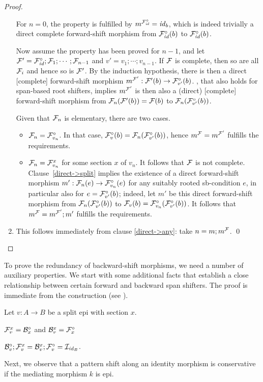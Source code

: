 \begin{proof}
\begin{enumerate}[topsep=\smallskipamount]
\smallskip For $n=0$, the property is fulfilled by $m^{\dF\id}=\id_b$, which is indeed trivially a direct complete forward-shift morphism from $\dF\id(b)$ to $\dF\id(b)$.

\smallskip Now assume the property has been proved for $n-1$, and let $\cF'=\dF\id;\cF_1;\cdots;\cF_{n-1}$ and $v'=v_1;\cdots;v_{n-1}$. If $\cF$ is complete, then so are all $\cF_i$ and hence so is $\cF'$. By the induction hypothesis, there is then a direct [complete] forward-shift morphism $m^{\cF'}:\cF'(b) \to \dF{v'}(b)$. , that also holds for span-based root shifters, implies $m^{\cF'}$ is then also a (direct) [complete] forward-shift morphism from $\cF_n(\cF'(b))=\cF(b)$ to $\cF_n(\dF{v'}(b))$.

\smallskip
Given that $\cF_n$ is elementary, there are two cases.
\begin{itemize}
\item $\cF_n=\dF{v_n}$. In that case, $\dF v(b)=\cF_n(\dF{v'}(b))$, hence $m^\cF=m^{\cF'}$ fulfills the requirements.
\item $\cF_n=\rF{v_n}x$ for some section $x$ of $v_n$. It follows that $\cF$ is not complete. Clause~\ref{direct->split} implies the existence of a direct forward-shift morphism $m':\cF_n(e)\to \dF{v_n}(e)$ for any suitably rooted sb-condition $e$, in particular also for $e=\dF{v'}(b)$; indeed, let $m'$ be this direct forward-shift morphism from $\cF_n(\dF{v'}(b))$ to $\cF_v(b)=\dF{v_n}(\dF{v'}(b))$. It follows that $m^\cF=m^{\cF'};m'$ fulfills the requirements.  
\end{itemize}

\item This follows immediately from clause \ref{direct->any}: take $n=m;m^\cF$.
\qed
\end{enumerate}
\end{proof}
%
To prove the redundancy of backward-shift morphisms, we need a number of auxiliary properties. We start with some additional facts that establish a close relationship between certain forward and backward span shifters. The proof is immediate from the construction (see ).

\begin{lemma}
Let $v:A\to B$ be a split epi with section $x$.
\begin{enumerateS}
\item $\rF v x=\dB x$ and $\rB v x=\dF x$
\item $\dB v;\rF v x=\rB v x;\dF v=\cI_{\id_B}$.
\end{enumerateS}
\end{lemma}
%
Next, we observe that a pattern shift along an identity morphism is conservative if the mediating morphism $k$ is epi.

